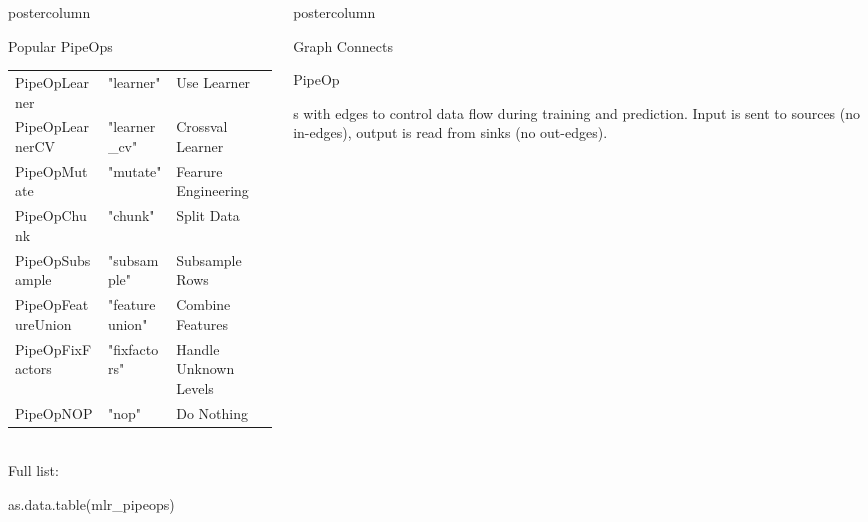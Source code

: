 \documentclass{beamer}
\newlength{\columnheight} %
\newcommand{\codeinline}[1]{\begin{codeboxinline}#1\end{codeboxinline}}
\begin{document}
\begin{frame}[fragile]{}
\begin{columns}
\begin{column}{.245\textwidth}
\begin{beamercolorbox}[center]{postercolumn}
\begin{minipage}{.98\textwidth}
{\begin{myblock}{Popular PipeOps}
\begin{footnotesize}
\begin{centering}
\begin{tabular}{l l l}
                    PipeOpLearner         & "learner"         & Use Learner           \\
                    PipeOpLearnerCV       & "learner\_cv"     & Crossval Learner      \\
                    PipeOpMutate          & "mutate"          & Fearure Engineering   \\
                    PipeOpChunk           & "chunk"           & Split Data            \\
                    PipeOpSubsample       & "subsample"       & Subsample Rows        \\
                    PipeOpFeatureUnion    & "featureunion"    & Combine Features      \\
                    PipeOpFixFactors      & "fixfactors"      & Handle Unknown Levels \\
                    PipeOpNOP             & "nop"             & Do Nothing            \\
                    \hline
                  \end{tabular}
                \end{centering}
              \end{footnotesize}
              \ \\
              Full list: \codeinline{as.data.table(mlr\_pipeops)}
            \end{myblock}
            \vfill}
        \end{minipage}
      \end{beamercolorbox}
    \end{column}
    \begin{column}{.245\textwidth}
      \begin{beamercolorbox}[center]{postercolumn}
        \begin{minipage}{.98\textwidth}
          \parbox[t][\columnheight]{\textwidth}{
            \begin{myblock}{Graph}
              Connects \codeinline{PipeOp}s with edges to control data flow during training and prediction. Input is sent to sources (no in-edges), output is read from sinks (no out-edges).
              \\

\end{myblock}}
\end{minipage}
\end{beamercolorbox}
\end{column}
\end{columns}
\end{frame}
\end{document}
